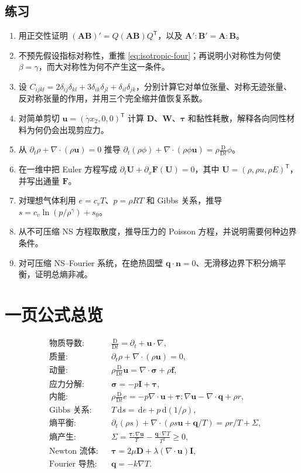 \documentclass[cn,hazy,blue,11pt,normal]{elegantnote}
\numberwithin{equation}{section}
\newcommand{\dd}{\,\mathrm d}
\newcommand{\Dt}{\frac{\mathrm D}{\mathrm Dt}}
\newcommand{\vct}[1]{\bm{#1}}
\newcommand{\ten}[1]{\bm{#1}}
\begin{document}
\subsection*{练习}
\begin{enumerate}
 \item 用正交性证明 $(\ten A\ten B)'=Q(\ten A\ten B)Q^{\mathsf T}$，以及 $\ten A':\ten B'=\ten A:\ten B$。
 \item 不预先假设指标对称性，重推 \eqref{eq:isotropic-four}；再说明小对称性为何使 $\beta=\gamma$，而大对称性为何不产生这一条件。
 \item 设 $C_{ijkl}=2\delta_{ij}\delta_{kl}+3\delta_{ik}\delta_{jl}+\delta_{il}\delta_{jk}$，分别计算它对单位张量、对称无迹张量、反对称张量的作用，并用三个完全缩并值恢复系数。
 \item 对简单剪切 $\vct u=(\dot\gamma x_2,0,0)^{\mathsf T}$ 计算 $\ten D$、$\ten W$、$\ten\tau$ 和黏性耗散，解释各向同性材料为何仍会出现剪应力。
 \item 从 $\partial_t\rho+\nabla\cdot(\rho\vct u)=0$ 推导
 $\partial_t(\rho\phi)+\nabla\cdot(\rho\phi\vct u)=\rho\Dt\phi$。
 \item 在一维中把 Euler 方程写成 $\partial_t\vct U+\partial_x\vct F(\vct U)=0$，其中
 $\vct U=(\rho,\rho u,\rho E)^{\mathsf T}$，并写出通量 $\vct F$。
 \item 对理想气体利用 $e=c_vT$、$p=\rho RT$ 和 Gibbs 关系，推导
 $s=c_v\ln(p/\rho^\gamma)+s_0$。
 \item 从不可压缩 NS 方程取散度，推导压力的 Poisson 方程，并说明需要何种边界条件。
 \item 对可压缩 NS--Fourier 系统，在绝热固壁 $\vct q\cdot\vct n=0$、无滑移边界下积分熵平衡，证明总熵非减。
\end{enumerate}

\clearpage
\section{一页公式总览}

\begin{align*}
 &\text{物质导数:} &&\Dt=\partial_t+\vct u\cdot\nabla,\\
 &\text{质量:} &&\partial_t\rho+\nabla\cdot(\rho\vct u)=0,\\
 &\text{动量:} &&\rho\Dt\vct u=\nabla\cdot\ten\sigma+\rho\vct f,\\
 &\text{应力分解:} &&\ten\sigma=-p\ten I+\ten\tau,\\
 &\text{内能:} &&\rho\Dt e=-p\nabla\cdot\vct u
 +\ten\tau:\nabla\vct u-\nabla\cdot\vct q+\rho r,\\
 &\text{Gibbs 关系:} &&T\dd s=\dd e+p\dd(1/\rho),\\
 &\text{熵平衡:} &&\partial_t(\rho s)+\nabla\cdot(\rho s\vct u+\vct q/T)
 =\rho r/T+\Sigma,\\
 &\text{熵产生:} &&\Sigma=\frac{\ten\tau:\nabla\vct u}{T}
 -\frac{\vct q\cdot\nabla T}{T^2}\ge0,\\
 &\text{Newton 流体:} &&\ten\tau=2\mu\ten D+\lambda(\nabla\cdot\vct u)\ten I,\\
 &\text{Fourier 导热:} &&\vct q=-k\nabla T.
\end{align*}

\bigskip
\begin{center}
\end{center}
\end{document}
